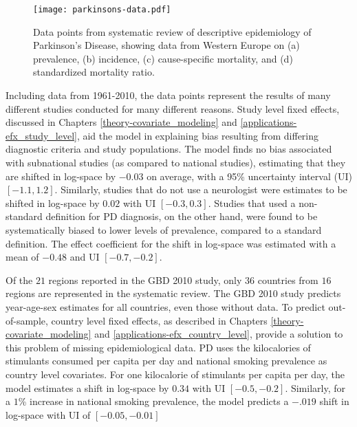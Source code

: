     \begin{figure}[h]
        \begin{center}
            \texttt{[image: parkinsons-data.pdf]}
            \caption{Data points from systematic review of descriptive
              epidemiology of Parkinson's Disease, showing data from
              Western Europe on (a) prevalence, (b) incidence, (c)
              cause-specific mortality, and (d) standardized mortality
              ratio.}
            \label{fig:intro-parkinsons data}
        \end{center}
    \end{figure}

Including data from 1961-2010, the data points represent the results
of many different studies conducted for many different reasons.  Study
level fixed effects, discussed in Chapters
\ref{theory-covariate_modeling} and
\ref{applications-efx_study_level}, aid the model in explaining bias
resulting from differing diagnostic criteria and study populations.
The model finds no bias associated with subnational studies (as
compared to national studies), estimating that they are shifted in
log-space by $-0.03$ on average, with a 95\% uncertainty interval (UI)
$[-1.1, 1.2]$.  Similarly, studies that do not use a neurologist were
estimates to be shifted in log-space by $0.02$ with UI $[-0.3, 0.3]$.
Studies that used a non-standard definition for PD diagnosis, on the
other hand, were found to be systematically biased to lower levels of
prevalence, compared to a standard definition. The effect coefficient
for the shift in log-space was estimated with a mean of $-0.48$ and UI
$[-0.7, -0.2]$.

Of the $21$ regions reported in the GBD 2010 study, only $36$ countries
from $16$ regions are represented in the systematic review.  The GBD
2010 study predicts year-age-sex estimates for all countries, even
those without data.  To predict out-of-sample, country level fixed
effects, as described in Chapters \ref{theory-covariate_modeling} and
\ref{applications-efx_country_level}, provide a solution to this
problem of missing epidemiological data.  PD uses the
kilocalories of stimulants consumed per capita per day and national smoking prevalence
as country level covariates.  For one kilocalorie of stimulants per 
capita per day, the model estimates a shift in log-space by $0.34$ 
with UI $[-0.5, -0.2]$.  Similarly, for a $1$\% increase in national
smoking prevalence, the model predicts a $-.019$ shift in log-space with UI
of $[-0.05, -0.01]$

